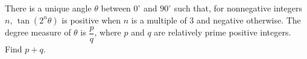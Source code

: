 There is a unique angle $\theta$ between $0^\circ$ and $90^\circ$ such that, for nonnegative integers $n$, $\tan(2^n\theta)$ is positive when $n$ is a multiple of $3$ and negative otherwise. The degree measure of $\theta$ is $\dfrac pq$, where $p$ and $q$ are relatively prime positive integers. Find $p+q$.
